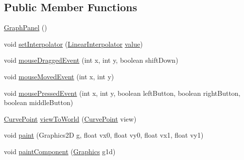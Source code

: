 \subsection*{Public Member Functions}
\begin{DoxyCompactItemize}
\item 
\mbox{\hyperlink{classorg_1_1newdawn_1_1slick_1_1tools_1_1peditor_1_1_graph_editor_window_1_1_graph_panel_a57f061e9016d6cd5206ba3467f01445c}{Graph\+Panel}} ()
\item 
void \mbox{\hyperlink{classorg_1_1newdawn_1_1slick_1_1tools_1_1peditor_1_1_graph_editor_window_1_1_graph_panel_a290757906b8a1372930a6d0f29f886da}{set\+Interpolator}} (\mbox{\hyperlink{classorg_1_1newdawn_1_1slick_1_1particles_1_1_configurable_emitter_1_1_linear_interpolator}{Linear\+Interpolator}} \mbox{\hyperlink{classorg_1_1newdawn_1_1slick_1_1tools_1_1peditor_1_1_graph_editor_window_1_1_graph_panel_a251a328f85d3f44ea54d13ce658446f9}{value}})
\item 
void \mbox{\hyperlink{classorg_1_1newdawn_1_1slick_1_1tools_1_1peditor_1_1_graph_editor_window_1_1_graph_panel_a919b8141a6fcc02c730ef42efc395e8b}{mouse\+Dragged\+Event}} (int x, int y, boolean shift\+Down)
\item 
void \mbox{\hyperlink{classorg_1_1newdawn_1_1slick_1_1tools_1_1peditor_1_1_graph_editor_window_1_1_graph_panel_a07bb6aa0290d522eeca396a8aa39905f}{mouse\+Moved\+Event}} (int x, int y)
\item 
void \mbox{\hyperlink{classorg_1_1newdawn_1_1slick_1_1tools_1_1peditor_1_1_graph_editor_window_1_1_graph_panel_a94facf1f29f716b1c9fe191072ec7a75}{mouse\+Pressed\+Event}} (int x, int y, boolean left\+Button, boolean right\+Button, boolean middle\+Button)
\item 
\mbox{\hyperlink{classorg_1_1newdawn_1_1slick_1_1tools_1_1peditor_1_1_graph_editor_window_1_1_graph_panel_1_1_curve_point}{Curve\+Point}} \mbox{\hyperlink{classorg_1_1newdawn_1_1slick_1_1tools_1_1peditor_1_1_graph_editor_window_1_1_graph_panel_a025fc1c1977fc664b766c6f3ecede41b}{view\+To\+World}} (\mbox{\hyperlink{classorg_1_1newdawn_1_1slick_1_1tools_1_1peditor_1_1_graph_editor_window_1_1_graph_panel_1_1_curve_point}{Curve\+Point}} view)
\item 
void \mbox{\hyperlink{classorg_1_1newdawn_1_1slick_1_1tools_1_1peditor_1_1_graph_editor_window_1_1_graph_panel_a3eae15c7773d95fac15406bcb20e97c0}{paint}} (Graphics2D g, float vx0, float vy0, float vx1, float vy1)
\item 
void \mbox{\hyperlink{classorg_1_1newdawn_1_1slick_1_1tools_1_1peditor_1_1_graph_editor_window_1_1_graph_panel_aec6f2a49dc598f14ae63d0bc0c385876}{paint\+Component}} (\mbox{\hyperlink{classorg_1_1newdawn_1_1slick_1_1_graphics}{Graphics}} g1d)

\end{DoxyCompactItemize}
